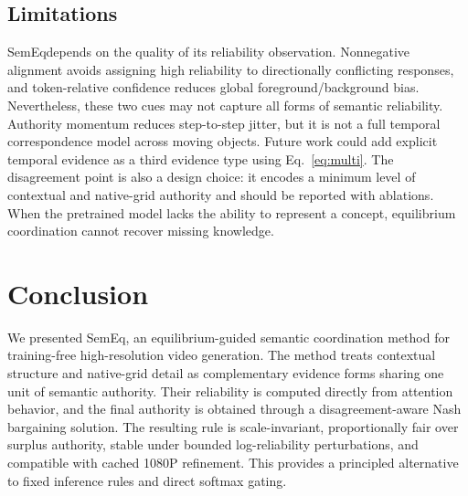\documentclass[10pt,twocolumn]{article}
\newcommand{\method}{SemEq}
\begin{document}
\subsection{Limitations}

\method depends on the quality of its reliability observation. Nonnegative alignment avoids assigning high reliability to directionally conflicting responses, and token-relative confidence reduces global foreground/background bias. Nevertheless, these two cues may not capture all forms of semantic reliability. Authority momentum reduces step-to-step jitter, but it is not a full temporal correspondence model across moving objects. Future work could add explicit temporal evidence as a third evidence type using Eq.~\eqref{eq:multi}. The disagreement point is also a design choice: it encodes a minimum level of contextual and native-grid authority and should be reported with ablations. When the pretrained model lacks the ability to represent a concept, equilibrium coordination cannot recover missing knowledge.

\section{Conclusion}

We presented \method, an equilibrium-guided semantic coordination method for training-free high-resolution video generation. The method treats contextual structure and native-grid detail as complementary evidence forms sharing one unit of semantic authority. Their reliability is computed directly from attention behavior, and the final authority is obtained through a disagreement-aware Nash bargaining solution. The resulting rule is scale-invariant, proportionally fair over surplus authority, stable under bounded log-reliability perturbations, and compatible with cached 1080P refinement. This provides a principled alternative to fixed inference rules and direct softmax gating.
\end{document}
